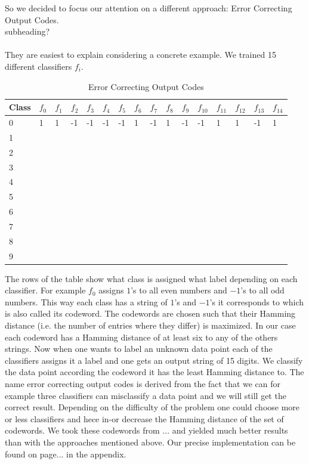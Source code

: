 \documentclass[12pt, a4paper, openany, bibliography=totoc]{report} %
\theoremstyle{definition}
\numberwithin{equation}{chapter}
\begin{document}
So we decided to focus our attention on a different approach: Error Correcting Output Codes. 
\\
subheading? \\
\\
They are easiest to explain considering a concrete example. We trained 15 different classifiers $f_i$. 

\begin{table}[ht!]
	\centering
	\caption{Error Correcting Output Codes}
	\label{Codewords}
	\begin{tabular}{|l|l|l|l|l|l|l|l|l|l|l|l|l|l|l|l|}
	\hline
	Class	& $f_0$ & $f_1$ & $f_2$ & $f_3$ & $f_4$ & $f_5$ & $f_6$ & $f_7$ & $f_8$ & $f_9$ & $f_{10}$ & $f_{11}$ & $f_{12}$ & $f_{13}$ & $f_{14}$ \\ \hline \hline
	0	& 1 & 1 & -1 & -1 & -1 & -1 & 1 & -1 & 1 & -1 & -1 & 1 & 1 & -1 & 1 \\ \hline
	1	&  &  &  &  &  &  &  &  &  &  &  &  &  &  & \\ \hline
	2	&  &  &  &  &  &  &  &  &  &  &  &  &  &  & \\ \hline
	3	&  &  &  &  &  &  &  &  &  &  &  &  &  &  & \\ \hline
	4	&  &  &  &  &  &  &  &  &  &  &  &  &  &  & \\ \hline
	5	&  &  &  &  &  &  &  &  &  &  &  &  &  &  & \\ \hline
	6	&  &  &  &  &  &  &  &  &  &  &  &  &  &  & \\ \hline
	7	&  &  &  &  &  &  &  &  &  &  &  &  &  &  & \\ \hline
	8	&  &  &  &  &  &  &  &  &  &  &  &  &  &  & \\ \hline
	9	&  &  &  &  &  &  &  &  &  &  &  &  &  &  & \\ \hline
	\end{tabular}
\end{table}  

The rows of the table show what class is assigned what label depending on each classifier. For example $f_0$ assigns $1$'s to all even numbers and $-1$'s to all odd numbers. This way each class has a string of $1$'s and $-1$'s it corresponds to which is also called its codeword. The codewords are chosen such that their Hamming distance (i.e. the number of entries where they differ) is maximized. In our case each codeword has a Hamming distance of at least six to any of the others strings. Now when one wants to label an unknown data point each of the classifiers assigns it a label and one gets an output string of 15 digits. We classify the data point according the codeword it has the least Hamming distance to. The name error correcting output codes is derived from the fact that we can for example three classifiers can misclassify a data point and we will still get the correct result. Depending on the difficulty of the problem one could choose more or less classifiers and hece in-or decrease the Hamming distance of the set of codewords. We took these codewords from ... and yielded much better results than with the approaches mentioned above. Our precise implementation can be found on page... in the appendix. 
\end{document}
